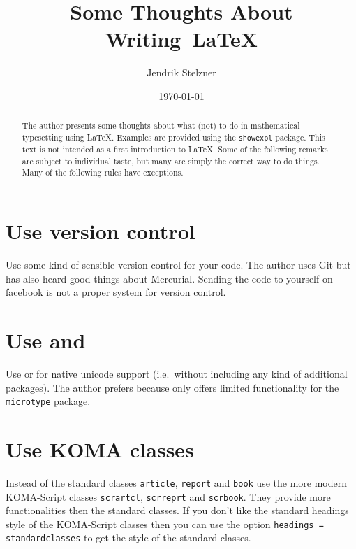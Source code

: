 \documentclass[a4paper, 10pt, abstract=on, headings=standardclasses]{scrartcl}
\title{Some Thoughts About Writing~\LaTeX}
\author{Jendrik Stelzner}
\date{\today}
\begin{document}
\maketitle

\begin{abstract}
  The author presents some thoughts about what (not) to do in mathematical typesetting using \LaTeX.
  Examples are provided using the \texttt{showexpl} package.
  This text is not intended as a first introduction to \LaTeX.
  Some of the following remarks are subject to individual taste, but many are simply the correct way to do things.
  Many of the following rules have exceptions.
\end{abstract}

\tableofcontents





\section{Use version control}

Use some kind of sensible version control for your code.
The author uses Git but has also heard good things about Mercurial.
Sending the code to yourself on facebook is not a proper system for version control.





\section{Use  and }

Use  or  for native unicode support (i.e.\ without including any kind of additional packages).
The author prefers  because  only offers limited functionality for the \texttt{microtype} package.





\section{Use KOMA classes}

Instead of the standard classes \texttt{article}, \texttt{report} and \texttt{book} use the more modern KOMA-Script classes \texttt{scrartcl}, \texttt{scrreprt} and \texttt{scrbook}.
They provide more functionalities then the standard classes.
If you don’t like the standard headings style of the KOMA-Script classes then you can use the option \texttt{headings = standardclasses} to get the style of the standard classes.
\end{document}
